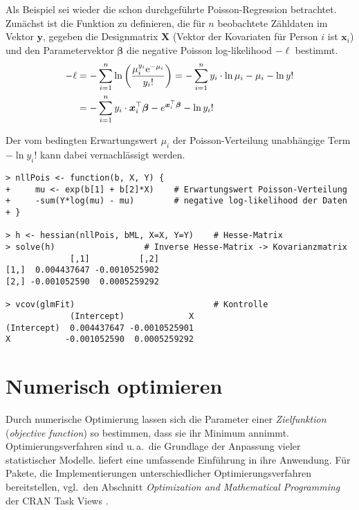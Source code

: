 Als Beispiel sei wieder die schon durchgeführte Poisson-Regression betrachtet. Zunächst ist die Funktion zu definieren, die für $n$ beobachtete Zähldaten im Vektor $\bm{y}$, gegeben die Designmatrix $\bm{X}$ (Vektor der Kovariaten für Person $i$ ist $\bm{x}_{i}$) und den Parametervektor $\bm{\beta}$ die negative Poisson log-likelihood $-\ell$ bestimmt.
\begin{align*}
-\ell &= -\sum_{i=1}^{n} \ln \left(\frac{\mu_{i}^{y_{i}} {\mathrm{e}}^{-\mu_{i}}}{y_{i}!}\right) = -\sum_{i=1}^{n} y_{i} \cdot \ln \mu_{i} - \mu_{i} - \ln y!\\
      &= -\sum_{i=1}^{n} y_{i} \cdot \bm{x}_{i}^{\top} \bm{\beta} - e^{\bm{x}_{i}^{\top} \bm{\beta}} - \ln y_{i}!
\end{align*}

Der vom bedingten Erwartungswert $\mu_{i}$ der Poisson-Verteilung unabhängige Term $- \ln y_{i}!$ kann dabei vernachlässigt werden.
\begin{lstlisting}
> nllPois <- function(b, X, Y) {
+     mu <- exp(b[1] + b[2]*X)    # Erwartungswert Poisson-Verteilung
+     -sum(Y*log(mu) - mu)        # negative log-likelihood der Daten
+ }

> h <- hessian(nllPois, bML, X=X, Y=Y)    # Hesse-Matrix
> solve(h)                  # Inverse Hesse-Matrix -> Kovarianzmatrix
             [,1]          [,2]
[1,]  0.004437647 -0.0010525902
[2,] -0.001052590  0.0005259292

> vcov(glmFit)                            # Kontrolle
             (Intercept)             X
(Intercept)  0.004437647 -0.0010525901
X           -0.001052590  0.0005259292
\end{lstlisting}

\section{Numerisch optimieren}
\label{sec:optim}

Durch numerische Optimierung lassen sich die Parameter einer \emph{Zielfunktion} (\emph{objective function}) so bestimmen, dass sie ihr Minimum annimmt. Optimierungsverfahren sind u.\,a.\ die Grundlage der Anpassung vieler statistischer Modelle.  liefert eine umfassende Einführung in ihre Anwendung. Für Pakete, die Implementierungen unterschiedlicher Optimierungsverfahren bereitstellen, vgl.\ den Abschnitt \emph{Optimization and Mathematical Programming} der CRAN Task Views \cite{CRANtvOptim}.

